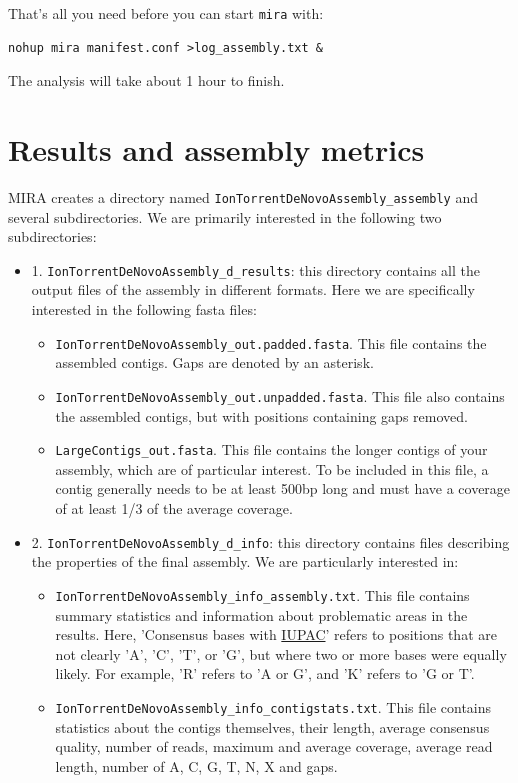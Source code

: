 \documentclass[11pt]{article}
\begin{document}
That's all you need before you can start \texttt{mira} with:

\begin{verbatim}
nohup mira manifest.conf >log_assembly.txt &
\end{verbatim}

The analysis will take about 1 hour to finish.

\section{Results and assembly metrics}
\label{sec-2}
MIRA creates a directory named \texttt{IonTorrentDeNovoAssembly\_assembly} and several
subdirectories. We are primarily interested in the following two
subdirectories: 
\begin{itemize}
\item 1. \texttt{IonTorrentDeNovoAssembly\_d\_results}: this directory contains all the output
files of the assembly in different formats. Here we are specifically
interested in the following fasta files:
\begin{itemize}
\item \texttt{IonTorrentDeNovoAssembly\_out.padded.fasta}. This file contains the assembled contigs. Gaps are denoted by an asterisk.
\item \texttt{IonTorrentDeNovoAssembly\_out.unpadded.fasta}. This file also contains
the assembled contigs, but with positions containing gaps removed.
\item \texttt{LargeContigs\_out.fasta}. This file contains the longer contigs of
your assembly, which are of particular interest. To be included in
this file, a contig generally needs to be at least 500bp long and
must have a coverage of at least 1/3 of the average coverage.
\end{itemize}
\item 2. \texttt{IonTorrentDeNovoAssembly\_d\_info}: this directory contains files describing the properties of
the final assembly. We are particularly interested in:
\begin{itemize}
\item \texttt{IonTorrentDeNovoAssembly\_info\_assembly.txt}. This file contains
summary statistics and information about problematic areas in the
results. Here, 'Consensus bases with \href{http://www.bioinformatics.org/sms/iupac.html}{IUPAC}' refers to positions
that are not clearly 'A', 'C', 'T', or 'G', but where two or more
bases were equally likely. For example, 'R' refers to 'A or G', and
'K' refers to 'G or T'.
\item \texttt{IonTorrentDeNovoAssembly\_info\_contigstats.txt}. This file
contains statistics about the contigs themselves, their length,
average consensus quality, number of reads, maximum and average
coverage, average read length, number of A, C, G, T, N, X and gaps.
\end{itemize}
\end{itemize}
\end{document}
